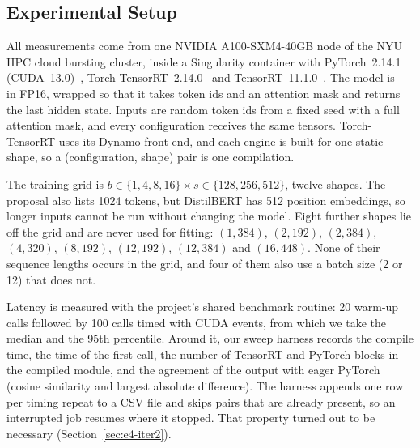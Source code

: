 \subsection{Experimental Setup}
\label{sec:e4-setup}

All measurements come from one NVIDIA A100-SXM4-40GB node of the NYU HPC cloud
bursting cluster, inside a Singularity container with PyTorch~2.14.1
(CUDA~13.0)~\cite{paszke2019pytorch}, Torch-TensorRT~2.14.0~\cite{torchtrt} and
TensorRT~11.1.0~\cite{tensorrt}. The model is
~\cite{sanh2019distilbert} in FP16, wrapped so
that it takes token ids and an attention mask and returns the last hidden
state. Inputs are random token ids from a fixed seed with a full attention
mask, and every configuration receives the same tensors. Torch-TensorRT uses
its Dynamo front end, and each engine is built for one static shape, so a
(configuration, shape) pair is one compilation.

The training grid is $b\in\{1,4,8,16\}\times s\in\{128,256,512\}$, twelve
shapes. The proposal also lists 1024 tokens, but DistilBERT has 512 position
embeddings, so longer inputs cannot be run without changing the model. Eight
further shapes lie off the grid and are never used for fitting:
$(1,384)$, $(2,192)$, $(2,384)$, $(4,320)$, $(8,192)$, $(12,192)$, $(12,384)$
and $(16,448)$. None of their sequence lengths occurs in the grid, and four
of them also use a batch size (2 or 12) that does not.

Latency is measured with the project's shared benchmark routine: 20 warm-up
calls followed by 100 calls timed with CUDA events, from which we take the
median and the 95th percentile. Around it, our sweep harness records the
compile time, the time of the first call, the number of TensorRT and PyTorch
blocks in the compiled module, and the agreement of the output with eager
PyTorch (cosine similarity and largest absolute difference). The harness
appends one row per timing repeat to a CSV file and skips pairs that are
already present, so an interrupted job resumes where it stopped. That property
turned out to be necessary (Section~\ref{sec:e4-iter2}).

